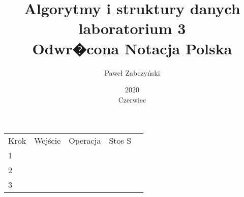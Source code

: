 \documentclass{article}
\title{Algorytmy i struktury danych laboratorium 3\\Odwr�cona Notacja Polska}
\author{Paweł Zabczyński}
\date{2020\\ Czerwiec}
\begin{document}
\maketitle

\subject*{I}
\begin{table}[caption=I]
\begin{tabular}{lllll}
Krok & Wejście & Operacja & Stos S &  \\
1    &         &          &        &  \\
2    &         &          &        &  \\
3    &         &          &        &
\end{tabular}
\end{table}
\end{document}

